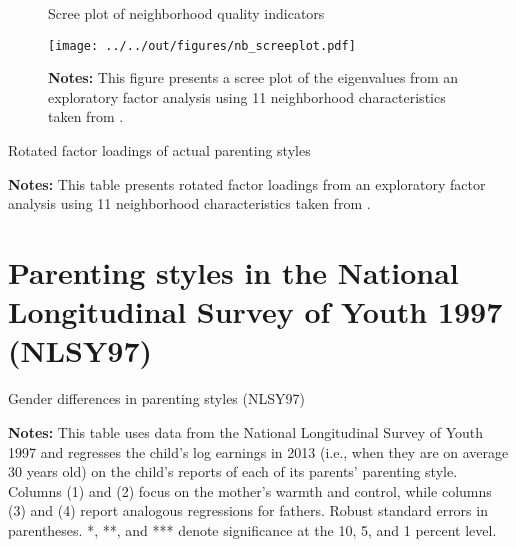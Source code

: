 \documentclass[12pt, a4paper, english]{article}
\begin{document}
\begin{figure}[h!]\centering
    \caption{Scree plot of neighborhood quality indicators}\label{fig:screeplot_nb}
    \texttt{[image: ../../out/figures/nb\_screeplot.pdf]} 
    \caption*{\footnotesize \textbf{Notes:} This figure presents a scree plot of the eigenvalues from an exploratory factor analysis using 11 neighborhood characteristics taken from \citet{ChettyHendren2018Exposure,ChettyHendren2018County}.}
\end{figure}

\begin{table}[h!]
    \caption{Rotated factor loadings of actual parenting styles}\label{tab:factorloadings_nb}
    \centering
         
    \vspace{0.5em}
    \caption*{\footnotesize \textbf{Notes:} This table presents rotated factor loadings from an exploratory factor analysis using 11 neighborhood characteristics taken from \citet{ChettyHendren2018Exposure,ChettyHendren2018County}.}
\end{table}


\clearpage
\section{Parenting styles in the National Longitudinal Survey of Youth 1997 (NLSY97)}\label{app:nlsy}
\setcounter{table}{0}
\setcounter{figure}{0}
\setcounter{footnote}{0}

\begin{table}[h!]
    \caption{Gender differences in parenting styles (NLSY97)}\label{tab:nlsy_actualreturns}
        \centering
        
    \vspace{0.5em}
    \caption*{\footnotesize \textbf{Notes:} This table uses data from the National Longitudinal Survey of Youth 1997 and regresses the child's log earnings in 2013 (i.e., when they are on average 30 years old) on the child's reports of each of its parents' parenting style. Columns (1) and (2) focus on the mother's warmth and control, while columns (3) and (4) report analogous regressions for fathers. Robust standard errors in parentheses.  *, **, and *** denote significance at the 10, 5, and 1 percent level.}
\end{table}
\end{document}

